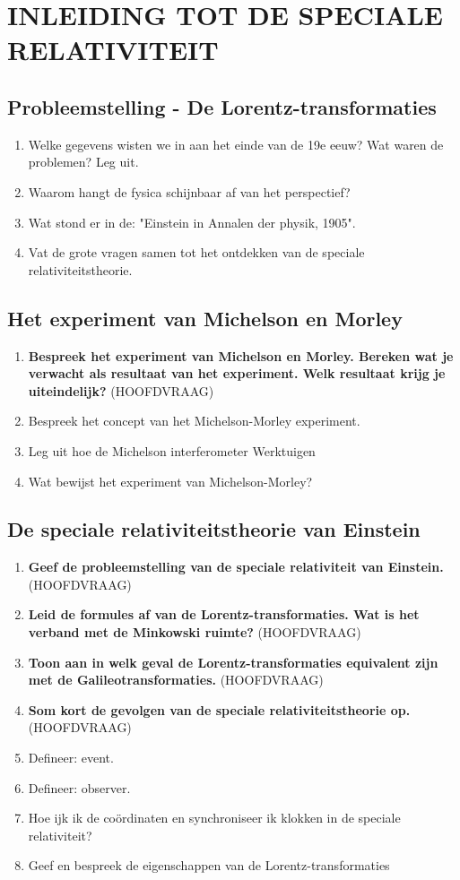 \documentclass[a4paper,12pt]{article}
\begin{document}
    \section{INLEIDING TOT DE SPECIALE RELATIVITEIT}
    \subsection{Probleemstelling - De Lorentz-transformaties}
    \begin{enumerate}
        \item Welke gegevens wisten we in aan het einde van de 19e eeuw? Wat waren de problemen? Leg uit.
        \item Waarom hangt de fysica schijnbaar af van het perspectief?
        \item Wat stond er in de: "Einstein in Annalen der physik, 1905".
        \item Vat de grote vragen samen tot het ontdekken van de speciale relativiteitstheorie.
    \end{enumerate}
    \subsection{Het experiment van Michelson en Morley}
    \begin{enumerate}
        \item \textbf{Bespreek het experiment van Michelson en Morley. Bereken wat je verwacht als resultaat van het experiment. Welk resultaat krijg je uiteindelijk?} (HOOFDVRAAG)
        \item Bespreek het concept van het Michelson-Morley experiment.
        \item Leg uit hoe de Michelson interferometer Werktuigen
        \item Wat bewijst het experiment van Michelson-Morley?
    \end{enumerate}
    \subsection{De speciale relativiteitstheorie van Einstein}
    \begin{enumerate}
        \item \textbf{Geef de probleemstelling van de speciale relativiteit van Einstein.} (HOOFDVRAAG)
        \item \textbf{Leid de formules af van de Lorentz-transformaties. Wat is het verband met de Minkowski ruimte?} (HOOFDVRAAG)
        \item \textbf{Toon aan in welk geval de Lorentz-transformaties equivalent zijn met de Galileotransformaties.} (HOOFDVRAAG)
        \item \textbf{Som kort de gevolgen van de speciale relativiteitstheorie op.} (HOOFDVRAAG)
        \item Defineer: event.
        \item Defineer: observer.
        \item Hoe ijk ik de coördinaten en synchroniseer ik klokken in de speciale relativiteit?
        \item Geef en bespreek de eigenschappen van de Lorentz-transformaties
    \end{enumerate}
\end{document}
